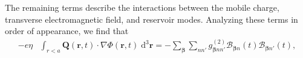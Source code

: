 \documentclass{article}
\begin{document}
The remaining terms describe the interactions between the mobile charge, transverse electromagnetic field, and reservoir modes. Analyzing these terms in order of appearance, we find that
\begin{equation}
\begin{split}
-e\eta&\int_{r<a}\mathbf{Q}(\mathbf{r},t)\cdot\nabla\Phi(\mathbf{r},t)\;\mathrm{d}^3\mathbf{r}
= -\sum_{\bm{\beta}}\sum_{nn'}g_{\bm{\beta}nn'}^{(2)}\mathcal{B}_{\bm{\beta}n}(t)\mathcal{B}_{\bm{\beta}n'}(t),
\end{split}
\end{equation}
\end{document}
